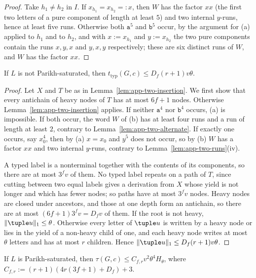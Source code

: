 \begin{proof}
Take $h_1\ne h_2$ in $I$.  If $x_{h_1}=x_{h_2}=:x$, then $W$ has the factor $xx$
(the first two letters of a pure component of length at least $5$) and two
internal $y$-runs, hence at least five runs.  Otherwise both $\mathtt a^5$ and
$\mathtt b^5$ occur, by the argument for (a) applied to $h_1$ and to $h_2$, and with $x:=x_{h_1}$ and $y:=x_{h_2}$ the two pure
components contain the runs $x,y,x$ and $y,x,y$ respectively; these are six
distinct runs of $W$, and $W$ has the factor $xx$.
\end{proof}

\begin{proposition}\label{prop:app-two-nonsaturated}
If $L$ is not Parikh-saturated, then $t_{\mathrm{typ}}(G,c)\le D_f(r+1)v\theta$.
\end{proposition}

\begin{proof}
Let $X$ and $T$ be as in Lemma~\ref{lem:app-two-insertion}.  We first show that
every antichain of heavy nodes of $T$ has at most $6f+1$ nodes.  Otherwise
Lemma~\ref{lem:app-two-insertion} applies.  If neither $\mathtt a^4$ nor
$\mathtt b^4$ occurs, (a) is impossible.  If both occur, the word $W$ of (b)
has at least four runs and a run of length at least $2$, contrary to
Lemma~\ref{lem:app-two-alternate}.  If exactly one occurs, say $x_0^4$, then by
(a) $x=x_0$ and $y^5$ does not occur, so by (b) $W$ has a factor $xx$ and two
internal $y$-runs, contrary to Lemma~\ref{lem:app-two-runs}(iv).

A typed label is a nonterminal together with the contents of its components,
so there are at most $3^fv$ of them.  No typed label repeats on a path of $T$,
since cutting between two equal labels gives a derivation from $X$ whose yield
is not longer and which has fewer nodes; so paths have at most $3^fv$ nodes.
Heavy nodes are closed under ancestors, and those at one depth form an
antichain, so there are at most $(6f+1)3^fv=D_fv$ of them.  If the root is not
heavy, $\|\tuple u\|_1\le\theta$.  Otherwise every letter of $\tuple u$ is written by
a heavy node or lies in the yield of a non-heavy child of one, and each heavy
node writes at most $\theta$ letters and has at most $r$ children.  Hence
$\|\tuple u\|_1\le D_f(r+1)v\theta$.
\end{proof}

\begin{lemma}\label{lem:app-two-saturated}
If $L$ is Parikh-saturated, then
$\tau(G,c)\le C_{f,r}v^2\theta^4H_\theta$, where $C_{f,r}:=(r+1)(4r(3f+1)+D_f)+3$.
\end{lemma}

